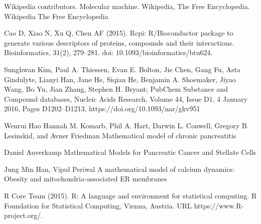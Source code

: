 
\begin{thebibliography}{00}

Wikipedia contributors. 
\newblock Molecular machine. 
\newblock Wikipedia, The Free Encyclopedia. Wikipedia The Free Encyclopedia

Cao D, Xiao N, Xu Q, Chen AF (2015). 
\newblock Rcpi: R/Bioconductor package to generate various descriptors of proteins, compounds and their interactions. 
\newblock Bioinformatics, 31(2), 279–281. doi: 10.1093/bioinformatics/btu624. 

Sunghwan Kim, Paul A. Thiessen, Evan E. Bolton, Jie Chen, Gang Fu, Asta Gindulyte, Lianyi Han, Jane He, Siqian He, Benjamin A. Shoemaker, Jiyao Wang, Bo Yu, Jian Zhang, Stephen H. Bryant; 
\newblock PubChem Substance and Compound databases, 
\newblock Nucleic Acids Research, Volume 44, Issue D1, 4 January 2016, Pages D1202–D1213, https://doi.org/10.1093/nar/gkv951

Wenrui Hao  Hannah M. Komarb, Phil A. Hart, Darwin L. Conwell, Gregory B. Lesinskid, and Avner Friedman
\newblock Mathematical model of chronic pancreatitis

Daniel  Auverkamp
\newblock Mathematical  Models  for  Pancreatic  Cancer  and Stellate  Cells

Jung Min Han, Vipul Periwal
\newblock A mathematical model of calcium dynamics: Obesity and mitochondria-associated ER membranes

R Core Team (2015). 
\newblock R: A language and environment for statistical computing. R Foundation for Statistical Computing, Vienna, Austria.
\newblock URL https://www.R-project.org/.

\end{thebibliography}

